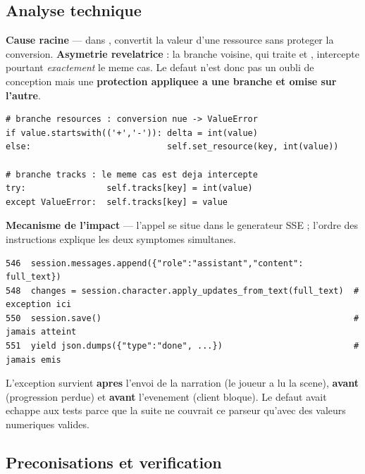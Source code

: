 \subsection{Analyse technique}

\textbf{Cause racine} --- dans ,  convertit la
valeur d'une ressource sans proteger la conversion. \textbf{Asymetrie revelatrice} : la branche
voisine, qui traite  et , intercepte pourtant \emph{exactement} le
meme cas. Le defaut n'est donc pas un oubli de conception mais une \textbf{protection appliquee a
une branche et omise sur l'autre}.

\begin{lstlisting}[style=python]
# branche resources : conversion nue -> ValueError
if value.startswith(('+','-')): delta = int(value)
else:                           self.set_resource(key, int(value))

# branche tracks : le meme cas est deja intercepte
try:                self.tracks[key] = int(value)
except ValueError:  self.tracks[key] = value
\end{lstlisting}

\textbf{Mecanisme de l'impact} --- l'appel se situe dans le generateur SSE ; l'ordre des
instructions explique les deux symptomes simultanes.

\begin{lstlisting}[style=python]
546  session.messages.append({"role":"assistant","content": full_text})
548  changes = session.character.apply_updates_from_text(full_text)  # exception ici
550  session.save()                                                  # jamais atteint
551  yield json.dumps({"type":"done", ...})                          # jamais emis
\end{lstlisting}

L'exception survient \textbf{apres} l'envoi de la narration (le joueur a lu la scene), \textbf{avant}
 (progression perdue) et \textbf{avant} l'evenement  (client bloque).
Le defaut avait echappe aux tests parce que la suite ne couvrait ce parseur qu'avec des valeurs
numeriques valides.

\subsection{Preconisations et verification}

